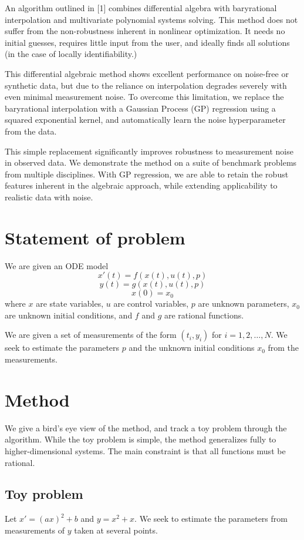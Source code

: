 \documentclass{ifacconf}
\begin{document}
	An algorithm outlined in [1] combines differential algebra with baryrational interpolation and multivariate polynomial systems  solving.  This method does not suffer from the non-robustness inherent in nonlinear optimization.  It needs no initial guesses, requires little input from the user, and ideally finds all solutions (in the case of locally identifiability.)  
	
	This differential algebraic method shows excellent performance on noise-free or synthetic data, but due to the reliance on interpolation degrades severely with even minimal measurement noise.  To overcome this limitation, we replace the baryrational interpolation with a Gaussian Process (GP) regression using a squared exponential kernel, and automatically learn the noise hyperparameter from the data.  
	
	This simple replacement significantly improves robustness to measurement noise in observed data.  We demonstrate the method on a suite of benchmark problems from multiple disciplines.  With GP regression, we are able to retain the robust features inherent in the algebraic approach, while extending applicability to realistic data with noise.   
	
	
	\section{Statement of problem}
	We are given an ODE model
	\[ x'(t) = f(x(t), u(t), p)\]
	\[ y(t) = g(x(t), u(t), p)\]
	\[ x(0) = x_0\]
	where $x$ are state variables, $u$ are control variables, $p$ are unknown parameters, $x_0$ are unknown initial conditions, and $f$ and $g$ are rational functions.  
	
	We are given a set of measurements of the form $(t_i, y_i)$ for $i = 1, 2, \ldots, N$.  We seek to estimate the parameters $p$ and the unknown initial conditions $x_0$ from the measurements.  
	
	\section{Method}
	We give a bird's eye view of the method, and track a toy problem through the algorithm.  While the toy problem is simple, the method generalizes fully to higher-dimensional systems.  The main constraint is that all functions must be rational.
	\subsection{Toy problem}
	Let $x' = (ax)^2 + b $ and $y = x^2+x$.  We seek to estimate the parameters from measurements of $y$ taken at several points.  
	
\end{document}
